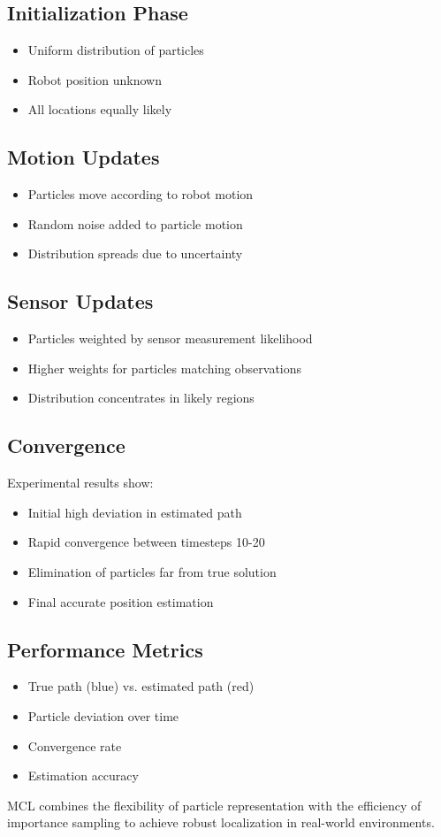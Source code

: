 \documentclass[openany]{book}
\theoremstyle{definition}
\theoremstyle{remark}
\newcommand{\note}[1]{
\begin{tcolorbox}[colback=green!5,colframe=green!40!black,title=Note]
 #1
\end{tcolorbox}
}
\begin{document}
\subsection{Initialization Phase}
\begin{itemize}
   \item Uniform distribution of particles
   \item Robot position unknown
   \item All locations equally likely
\end{itemize}

\subsection{Motion Updates}
\begin{itemize}
   \item Particles move according to robot motion
   \item Random noise added to particle motion
   \item Distribution spreads due to uncertainty
\end{itemize}

\subsection{Sensor Updates}
\begin{itemize}
   \item Particles weighted by sensor measurement likelihood
   \item Higher weights for particles matching observations
   \item Distribution concentrates in likely regions
\end{itemize}

\subsection{Convergence}
Experimental results show:
\begin{itemize}
   \item Initial high deviation in estimated path
   \item Rapid convergence between timesteps 10-20
   \item Elimination of particles far from true solution
   \item Final accurate position estimation
\end{itemize}

\subsection{Performance Metrics}
\begin{itemize}
   \item True path (blue) vs. estimated path (red)
   \item Particle deviation over time
   \item Convergence rate
   \item Estimation accuracy
\end{itemize}

\note{MCL combines the flexibility of particle representation with the efficiency of importance sampling to achieve robust localization in real-world environments.}
\end{document}

